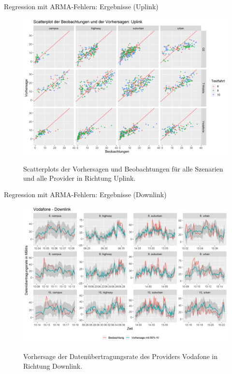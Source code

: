 \begin{frame}{Regression mit ARMA-Fehlern: Ergebnisse (Uplink)}
	\begin{figure}
		\centering
		\includegraphics[scale=0.38]{plots/arima/uplink/scatter_colored_axes_fixed}\\
		\caption{Scatterplots der Vorhersagen und Beobachtungen für alle Szenarien und alle Provider in Richtung Uplink.}
		\label{arima_scatter_ul}
	\end{figure}
\end{frame}

\begin{frame}{Regression mit ARMA-Fehlern: Ergebnisse (Downlink)}
	\begin{figure}
		\centering
		\includegraphics[scale=0.38]{plots/arima/downlink/vodafone_predictions}\\
		\caption{Vorhersage der Datenübertragungsrate des Providers Vodafone in Richtung Downlink.}
		\label{vodafone_predictions_dl}
	\end{figure}
\end{frame}

